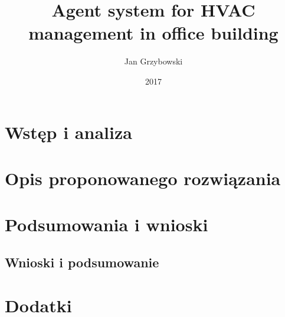 \documentclass[pl]{minipw} %
\title{Agent system for HVAC management in office building} %
\author{Jan Grzybowski}
\date{2017}
\begin{document}
\sloppy
  
\setcounter{page}{1}



\makestatement

\cleardoublepage
\tableofcontents

\cleardoublepage
\pagestyle{fancy}

\part{Wstęp i analiza}




\part{Opis proponowanego rozwiązania}








\part{Podsumowania i wnioski}
\chapter{Wnioski i podsumowanie}



\part{Dodatki}
\begin{appendices}
   
\end{appendices}


\end{document}
